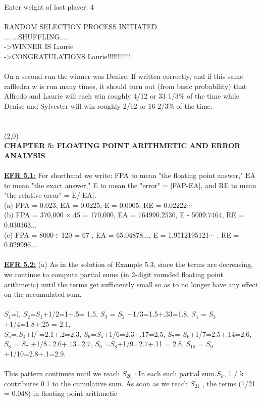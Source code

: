 \documentclass[../main.tex]{subfiles}
\begin{document}
Enter weight of last player: 4 \\
\\
RANDOM SELECTION PROCESS INITIATED\\
... ...SHUFFLING.... \\
->WINNER IS Laurie \\
->CONGRATULATIONS Laurie!!!!!!!!!!!! \\
\\
On a second run the winner was Denise. If written correctly, and if this same raffledra w is run 
many times, it should turn out (from basic probability) that Alfredo and Laurie will each win roughly 
4/12 or 33 1/3\% of the time while Denise and Sylvester will win roughly 2/12 or 16 2/3\% of the time. 
\\
\\
\\
\line(2,0){\textwidth}\\
\textbf{CHAPTER 5: FLOATING POINT ARITHMETIC AND ERROR 
ANALYSIS }
\\
\\
\underline{\textbf{EFR 5.1}:} For shorthand we write: FPA to mean "the floating point answer," EA to mean "the 
exact answer," E to mean the "error" = |FAP-EA|, and RE to mean "the relative error" = E/|EA|.\\ 
(a) FPA = 0.023, EA = 0.0225, E = 0.0005, RE = 0.02222$\cdots$\\
(b) FPA = 370,000 $\times$.45 = 170,000, EA = 164990.2536, E - 5009.7464, RE = 0.030363... \\
(c) FPA = 8000$ \div$ 120 = 67 , EA = 65.04878..., E = 1.9512195121$\cdots$ , RE = 0.029996... 
\\
\\
\textbf{\underline{EFR 5.2:}} (a) As in the solution of Example 5.3, since the terms are decreasing, we continue to 
compute partial sums (in 2-digit rounded floating point arithmetic) until the terms get sufficiently small 
so as to no longer have any effect on the accumulated sum. 
\\
\\
$S_1$=l, $S_2$=$S_1$+1/2=1+.5= 1.5, $S_3$ = $S_2$ +1/3=1.5+.33=1.8, $S_4$ = $S_3$+1/4=1.8+.25 = 2.1,\\ 
$S_5$=.$S_4$+l/ =2.1+.2=2.3, $S_6$=$S_5$+1/6=2.3+.17=2.5, $S_7$= $S_6$+1/7=2.5+.14=2.6, \\
$S_8$ = $S_7$ +1/8=2.6+.13=2.7, $S_9$ =$S_8$+1/9=2.7+.11 = 2.8, $S_{10}$ = $S_9$+1/10=2.8+.1=2.9.
\\
\\
This pattern continues until we reach $S_20$ : In each such partial sum.$S_k$, 1 / k contributes 0.1 to the cumulative sum. As soon as we reach $S_21$ , the terms (1/21 = 0.048) in floating point arithmetic 
\end{document}
